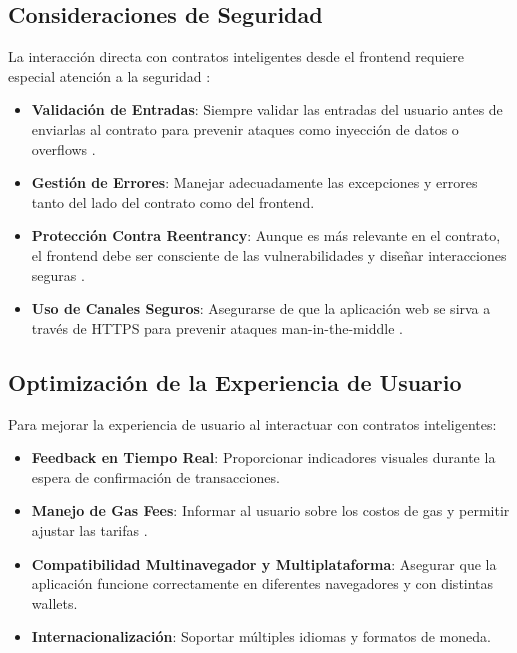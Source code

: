 \subsection{Consideraciones de Seguridad}

La interacción directa con contratos inteligentes desde el frontend requiere especial atención a la seguridad \cite{atzei2017survey}:

\begin{itemize}
    \item \textbf{Validación de Entradas}: Siempre validar las entradas del usuario antes de enviarlas al contrato para prevenir ataques como inyección de datos o overflows \cite{grishchenko2018semantic}.
    \item \textbf{Gestión de Errores}: Manejar adecuadamente las excepciones y errores tanto del lado del contrato como del frontend.
    \item \textbf{Protección Contra Reentrancy}: Aunque es más relevante en el contrato, el frontend debe ser consciente de las vulnerabilidades y diseñar interacciones seguras \cite{luu2016making}.
    \item \textbf{Uso de Canales Seguros}: Asegurarse de que la aplicación web se sirva a través de HTTPS para prevenir ataques man-in-the-middle \cite{wust2016ethereum}.
\end{itemize}

\subsection{Optimización de la Experiencia de Usuario}

Para mejorar la experiencia de usuario al interactuar con contratos inteligentes:

\begin{itemize}
    \item \textbf{Feedback en Tiempo Real}: Proporcionar indicadores visuales durante la espera de confirmación de transacciones.

    \item \textbf{Manejo de Gas Fees}: Informar al usuario sobre los costos de gas y permitir ajustar las tarifas \cite{zhou2020empirical}.

    \item \textbf{Compatibilidad Multinavegador y Multiplataforma}: Asegurar que la aplicación funcione correctamente en diferentes navegadores y con distintas wallets.

    \item \textbf{Internacionalización}: Soportar múltiples idiomas y formatos de moneda.

\end{itemize}

